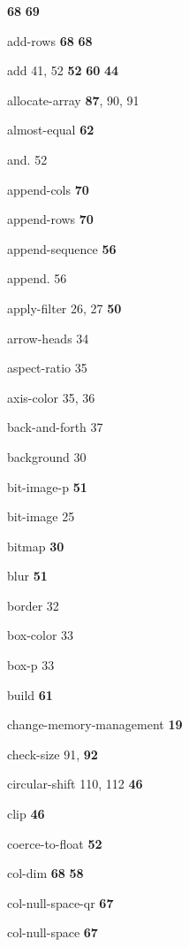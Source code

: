 \begin{theindex}
 {\bf 68}
 {\bf 69}
\item {\ptt add-rows}
 {\bf 68}
 {\bf 68}
\item {\ptt add} 41, 52
 {\bf 52}
 {\bf 60}
 {\bf 44}
\item {\ptt allocate-array} {\bf 87}, 90, 91
\item {\ptt almost-equal} {\bf 62}
\item {\ptt and.} 52
\item {\ptt append-cols} {\bf 70}
\item {\ptt append-rows} {\bf 70}
\item {\ptt append-sequence} {\bf 56}
\item {\ptt append.} 56
\item {\ptt apply-filter} 26, 27
 {\bf 50}
\item {\ptt arrow-heads} 34
\item {\ptt aspect-ratio} 35
\item {\ptt axis-color} 35, 36
\item {\ptt back-and-forth} 37
\item {\ptt background} 30
\item {\ptt bit-image-p} {\bf 51}
\item {\ptt bit-image} 25
\item {\ptt bitmap} {\bf 30}
\item {\ptt blur}
 {\bf 51}
\item {\ptt border} 32
\item {\ptt box-color} 33
\item {\ptt box-p} 33
\item {\ptt build}
 {\bf 61}
\item {\ptt change-memory-management} {\bf 19}
\item {\ptt check-size} 91, {\bf 92}
\item {\ptt circular-shift} 110, 112
 {\bf 46}
\item {\ptt clip}
 {\bf 46}
\item {\ptt coerce-to-float} {\bf 52}
\item {\ptt col-dim} {\bf 68}
 {\bf 58}
\item {\ptt col-null-space-qr} {\bf 67}
\item {\ptt col-null-space} {\bf 67}

\end{theindex}
